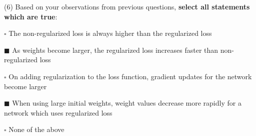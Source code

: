 (6) Based on your observations from previous questions, \textbf{select all statements which are true}:
\begin{list}{}
    \item $\square$ The non-regularized loss is always higher than the regularized loss
    \item $\blacksquare$ As weights become larger, the regularized loss increases faster than non-regularized loss
    \item $\square$ On adding regularization to the loss function, gradient updates for the network become larger
    \item $\blacksquare$ When using large initial weights, weight values decrease more rapidly for a network which uses regularized loss
    \item $\square$ None of the above
\end{list}